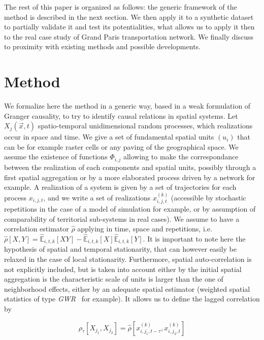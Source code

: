\documentclass[english]{./sageo}
\begin{document}
The rest of this paper is organized as follows: the generic framework of the method is described in the next section. We then apply it to a synthetic dataset to partially validate it and test its potentialities, what allows us to apply it then to the real case study of Grand Paris transportation network. We finally discuss to proximity with existing methods and possible developments.




\section{Method}


We formalize here the method in a generic way, based in a weak formulation of Granger causality, to try to identify causal relations in spatial systems. Let $X_j(\vec{x},t)$ spatio-temporal unidimensional random processes, which realizations occur in space and time. We give a set of fundamental spatial units  $(u_i)$ that can be for example raster cells or any paving of the geographical space. We assume the existence of functions $\Phi_{i,j}$ allowing to make the correspondance between the realization of each components and spatial units, possibly through a first spatial aggregation or by a more elaborated process driven by a network for example. A realization of a system is given by a set of trajectories for each process $x_{i,j,t}$, and we write a set of realizations $x^{(k)}_{i,j,t}$ (accessible by stochastic repetitions in the case of a model of simulation for example, or by assumption of comparability of territorial sub-systems in real cases). We assume to have a correlation estimator $\hat{\rho}$ applying in time, space and repetitions, i.e. $\hat{\rho}\left[X,Y\right] = \hat{\mathbb{E}}_{i,t,k}\left[XY\right] - \hat{\mathbb{E}}_{i,t,k}\left[X\right]\hat{\mathbb{E}}_{i,t,k}\left[Y\right]$. It is important to note here the hypothesis of spatial and temporal stationarity, that can however easily be relaxed in the case of local stationarity. Furthermore, spatial auto-correlation is not explicitly included, but is taken into account either by the initial spatial aggregation is the characteristic scale of units is larger than the one of neighborhood effects, either by an adequate spatial estimator (weighted spatial statistics of type \emph{GWR}~\cite{brunsdon1998geographically} for example). It allows us to define the lagged correlation by 


\begin{equation}
\rho_{\tau}\left[X_{j_1},X_{j_2}\right] = \hat{\rho}\left[x^{(k)}_{i,j_1,t - \tau},x^{(k)}_{i,j_2,t}\right]
\end{equation}
\end{document}
